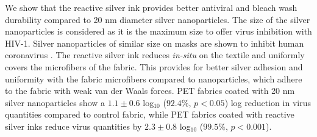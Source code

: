 \documentclass[journal=jacsat,manuscript=article]{achemso}
\begin{document}
We show that the reactive silver ink provides better antiviral and bleach wash durability compared to 20 nm diameter silver nanoparticles. The size of the silver nanoparticles is considered as it is the maximum size to offer virus inhibition with HIV-1. \cite{elechiguerra_interaction_2005} Silver nanoparticles of similar size on masks are shown to inhibit human coronavirus \cite{abulikemu:2022}. The reactive silver ink reduces \textit{in-situ}
on the textile and uniformly covers 
the microfibers of the fabric.  
This provides for better silver adhesion and uniformity with the fabric microfibers compared to nanoparticles, which adhere to the fabric with weak van der Waals forces. 
PET fabrics coated with 20 nm silver nanoparticles %
show a $1.1 \pm 0.6$ log$_{10}$ ($92.4 %
\%$, $p < 0.05$) log reduction in virus quantities compared to control fabric, 
while PET fabrics coated with reactive silver inks reduce virus quantities by $2.3 \pm 0.8$ log$_{10}$ ($99.5 %
\%$, $p < 0.001$). 
\end{document}
